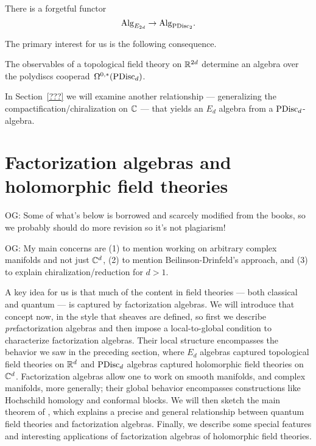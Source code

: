 \documentclass[11pt]{amsart}
\def\owen#1{{\textcolor{violet!65!black}{OG: {#1}}}}
\begin{document}
\begin{thm}
There is a forgetful functor
\[
{\rm Alg}_{E_{2d}} \to  {\rm Alg}_{{\rm PDisc}_2}.
\]
\end{thm}

The primary interest for us is the following consequence.

\begin{cor}
The observables of a topological field theory on $\mathbb R^{2d}$ determine an algebra over the polydiscs cooperad~$\Omega^{0,*}({\rm PDisc}_d)$.
\end{cor}

In Section~\ref{???} we will examine another relationship --- generalizing the compactification/chiralization on $\mathbb C$ --- that yields an $E_d$ algebra from a ${\rm PDisc}_d$-algebra.


\section{Factorization algebras and holomorphic field theories}
\label{prefactorization_algebras}

\owen{Some of what's below is borrowed and scarcely modified from the books, so we probably should do more revision so it's not plagiarism!}

\owen{My main concerns are (1) to mention working on arbitrary complex manifolds and not just $\mathbb C^d$, (2) to mention Beilinson-Drinfeld's approach, and (3) to explain chiralization/reduction for $d > 1$.}

A key idea for us is that much of the content in field theories --- both classical and quantum --- is captured by factorization algebras.
We will introduce that concept now, in the style that sheaves are defined, so first we describe {\em pre}\/factorization algebras and then impose a local-to-global condition to characterize factorization algebras.
Their local structure encompasses the behavior we saw in the preceding section, where $E_d$ algebras captured topological field theories on $\mathbb R^d$ and ${\rm PDisc}_d$ algebras captured holomorphic field theories on~$\mathbb C^d$.
Factorization algebras allow one to work on smooth manifolds, and complex manifolds, more generally;
their global behavior encompasses constructions like Hochschild homology and conformal blocks.
We will then sketch the main theorem of \cite{CG2}, 
which explains a precise and general relationship between quantum field theories and factorization algebras.
Finally, we describe some special features and interesting applications of factorization algebras of holomorphic field theories.
\end{document}
